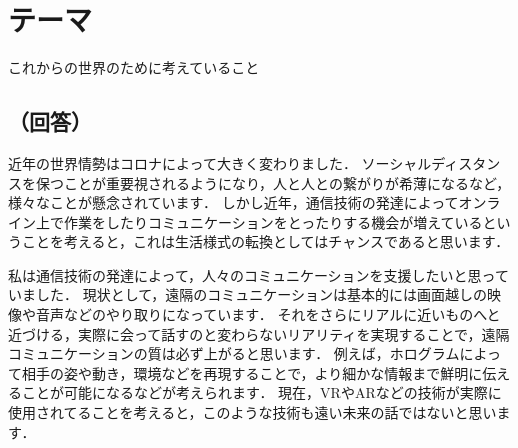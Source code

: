 \section*{テーマ}
これからの世界のために考えていること

\subsection*{（回答）}
近年の世界情勢はコロナによって大きく変わりました．
ソーシャルディスタンスを保つことが重要視されるようになり，人と人との繋がりが希薄になるなど，様々なことが懸念されています．
しかし近年，通信技術の発達によってオンライン上で作業をしたりコミュニケーションをとったりする機会が増えているということを考えると，これは生活様式の転換としてはチャンスであると思います．

私は通信技術の発達によって，人々のコミュニケーションを支援したいと思っていました．
現状として，遠隔のコミュニケーションは基本的には画面越しの映像や音声などのやり取りになっています．
それをさらにリアルに近いものへと近づける，実際に会って話すのと変わらないリアリティを実現することで，遠隔コミュニケーションの質は必ず上がると思います．
例えば，ホログラムによって相手の姿や動き，環境などを再現することで，より細かな情報まで鮮明に伝えることが可能になるなどが考えられます．
現在，VRやARなどの技術が実際に使用されてることを考えると，このような技術も遠い未来の話ではないと思います．
